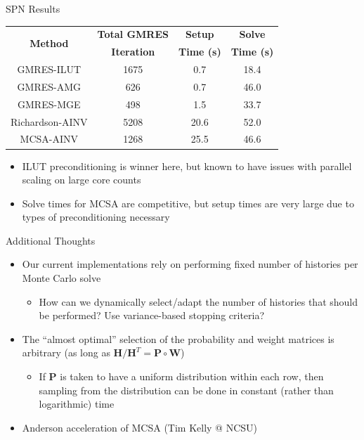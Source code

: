 \documentclass{beamer}
\begin{document}
\begin{frame}{SPN Results}
\begin{table}
\centering
\begin{tabular}{cccc}
\toprule
\multirow{2}{*}{\bfseries Method} &
\bfseries Total GMRES & \bfseries Setup & \bfseries Solve \\
& \bfseries Iteration & \bfseries Time (s) & \bfseries Time (s) \\
\midrule
GMRES-ILUT      & 1675 & 0.7  & 18.4 \\
GMRES-AMG       & 626  & 0.7  & 46.0 \\
GMRES-MGE       & 498  & 1.5  & 33.7 \\
Richardson-AINV & 5208 & 20.6 & 52.0 \\
MCSA-AINV       & 1268 & 25.5 & 46.6 \\
\bottomrule
\end{tabular}
\end{table}
\begin{itemize}
  \item ILUT preconditioning is winner here, but known to have issues
    with parallel scaling on large core counts
  \item Solve times for MCSA are competitive, but setup times are very large
    due to types of preconditioning necessary
\end{itemize}
\end{frame}
\begin{frame}{Additional Thoughts}
  \begin{itemize}
    \item Our current implementations rely on performing fixed number of
      histories per Monte Carlo solve
      \begin{itemize}
        \item How can we dynamically select/adapt the number of histories
          that should be performed?  Use variance-based stopping criteria?
      \end{itemize}
    \vfill
    \item The ``almost optimal'' selection of the probability and weight
      matrices is arbitrary (as long as
      $\mathbf{H}/\mathbf{H}^T=\mathbf{P} \circ \mathbf{W}$)
      \begin{itemize}
        \item If $\mathbf{P}$ is taken to have a uniform distribution within
          each row, then sampling from the distribution can be done in
          constant (rather than logarithmic) time
      \end{itemize}
    \vfill
    \item Anderson acceleration of MCSA (Tim Kelly @ NCSU)
  \end{itemize}
\end{frame}
\end{document}
